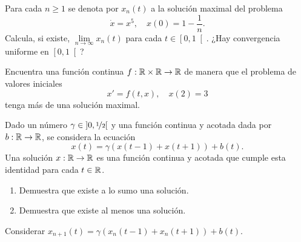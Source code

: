 \documentclass[12pt]{article}
\begin{document}
    \begin{ejercicio}
        Para cada $n \geq 1$ se denota por $x_n(t)$ a la solución maximal del problema
        \[
            \dot{x} = x^5, \quad x(0) = 1 - \frac{1}{n}.
        \]
        Calcula, si existe, $\lim\limits_{n \to \infty} x_n(t)$ para cada $t \in \left[0, 1\right[$. ¿Hay convergencia uniforme en $\left[0, 1\right[$?
    \end{ejercicio}

    \begin{ejercicio}
        Encuentra una función continua $f : \mathbb{R} \times \mathbb{R} \to \mathbb{R}$ de manera que el problema de valores iniciales
        \[
            x' = f(t, x), \quad x(2) = 3
        \]
        tenga más de una solución maximal.
    \end{ejercicio}

    \begin{ejercicio}
        Dado un número $\gamma \in \left]0, \nicefrac{1}{2}\right[$ y una función continua y acotada dada por $b : \mathbb{R} \to \mathbb{R}$, se considera la ecuación
        \[
            x(t) = \gamma(x(t - 1) + x(t + 1)) + b(t).
        \]
        Una solución $x : \mathbb{R} \to \mathbb{R}$ es una función continua y acotada que cumple esta identidad para cada $t \in \mathbb{R}$.
        \begin{enumerate}[label=\alph*)]
            \item Demuestra que existe a lo sumo una solución.
            \item Demuestra que existe al menos una solución.
        \end{enumerate}
        \begin{observacion}
            Considerar $x_{n+1}(t) = \gamma(x_n(t - 1) + x_n(t + 1)) + b(t)$.
        \end{observacion}
    \end{ejercicio}

    \newpage
    \setcounter{ejercicio}{0} %
    \noindent
\end{document}
